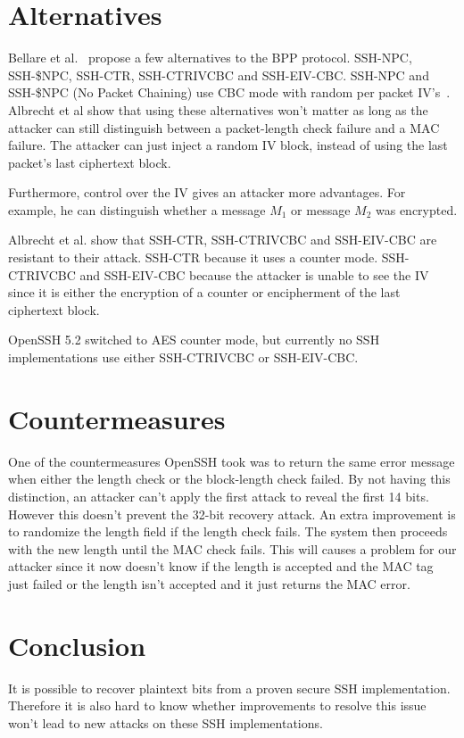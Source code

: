 \documentclass[twocolumn]{article}
\begin{document}
\section{Alternatives}
\indent Bellare et al.~\cite{Bellare2004} propose a few alternatives to the BPP protocol. SSH-NPC, SSH-\$NPC, SSH-CTR, SSH-CTRIVCBC and SSH-EIV-CBC.
\indent SSH-NPC and SSH-\$NPC (No Packet Chaining) use CBC mode with random per packet IV's~\cite{Albrecht2009}. Albrecht et al show that using these alternatives won't matter as long as the attacker can still distinguish between a packet-length check failure and a MAC failure. The attacker can just inject a random IV block, instead of using the last packet's last ciphertext block.

\indent Furthermore, control over the IV gives an attacker more advantages. For example, he can distinguish whether a message $M_1$ or message $M_2$ was encrypted.


\indent Albrecht et al. show that SSH-CTR, SSH-CTRIVCBC and SSH-EIV-CBC are resistant to their attack. SSH-CTR because it uses a counter mode. SSH-CTRIVCBC and SSH-EIV-CBC because the attacker is unable to see the IV since it is either the encryption of a counter or encipherment of the last ciphertext block.

\indent OpenSSH 5.2 switched to AES counter mode, but currently no SSH implementations use either SSH-CTRIVCBC or SSH-EIV-CBC.

\section{Countermeasures}
\indent One of the countermeasures OpenSSH took was to return the same error message when either the length check or the block-length check failed. By not having this distinction, an attacker can't apply the first attack to reveal the first 14 bits. However this doesn't prevent the 32-bit recovery attack. An extra improvement is to randomize the length field if the length check fails. The system then proceeds with the new length until the MAC check fails. This will causes a problem for our attacker since it now doesn't know if the length is accepted and the MAC tag just failed or the length isn't accepted and it just returns the MAC error.

\section{Conclusion}
It is possible to recover plaintext bits from a proven secure SSH implementation. Therefore it is also hard to know whether improvements to resolve this issue won't lead to new attacks on these SSH implementations.

\end{document}
